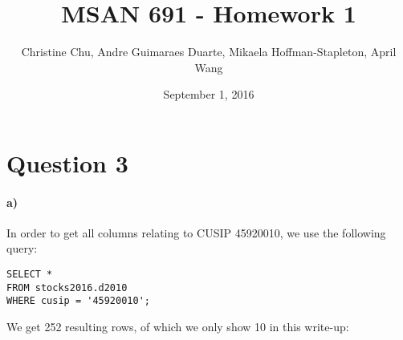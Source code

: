 \documentclass[]{article}
\title{MSAN 691 - Homework 1}
\author{Christine Chu, Andre Guimaraes Duarte, Mikaela Hoffman-Stapleton, April Wang}
\date{September 1, 2016}
\let\oldparagraph\paragraph
\renewcommand{\paragraph}[1]{\oldparagraph{#1}\mbox{}}
\begin{document}
\maketitle

\section*{Question 3}
\paragraph{a)}
In order to get all columns relating to CUSIP 45920010, we use the following query:

\color{blue}
\begin{verbatim}
SELECT *
FROM stocks2016.d2010
WHERE cusip = '45920010';
\end{verbatim}
\color{black}

We get 252 resulting rows, of which we only show 10 in this write-up:
\end{document}
